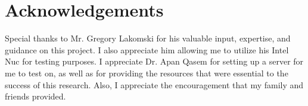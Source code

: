 \documentclass{sig-alternate}
\begin{document}
\section{Acknowledgements}
Special thanks to Mr. Gregory Lakomski for his valuable input, expertise, and guidance on this project. I also appreciate him allowing me to utilize his Intel Nuc for testing purposes. I appreciate Dr. Apan Qasem for setting up a server for me to test on, as well as for providing the resources that were essential to the success of this research. Also, I appreciate the encouragement that my family and friends provided.






\end{document}
